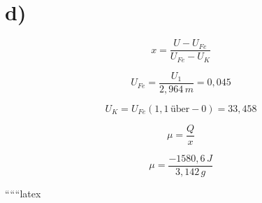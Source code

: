 

\section*{d)}

\[
x = \frac{U - U_{Fe}}{U_{Fe} - U_{K}}
\]

\[
U_{Fe} = \frac{U_{1}}{2,964 \, m} = 0,045
\]

\[
U_{K} = U_{Fe} (1,1 \, \text{über} - 0) = 33,458
\]

\[
\mu = \frac{Q}{x}
\]

\[
\mu = \frac{-1580,6 \, J}{3,142 \, g}
\]

``````latex